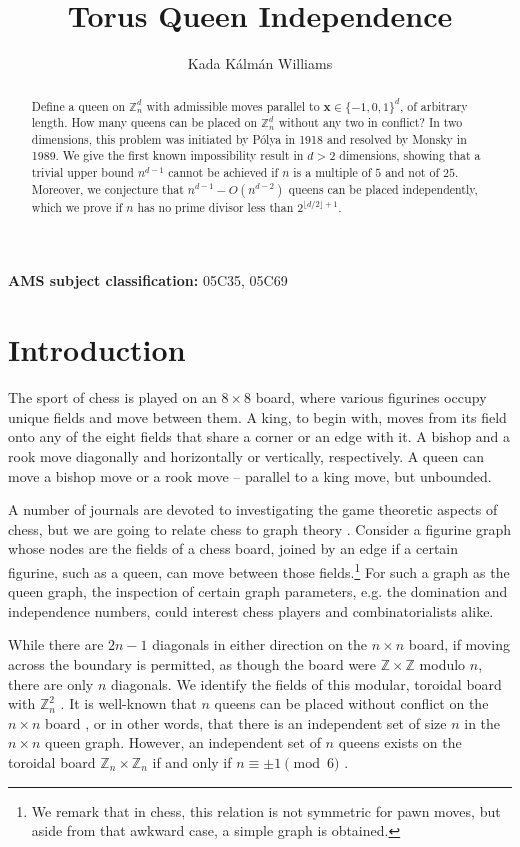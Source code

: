\documentclass[11pt]{article}
\title{Torus Queen Independence}
\author{Kada Kálmán Williams}
\begin{document}
\maketitle

\begin{abstract}
    Define a queen on $\mathbb{Z}_n^d$ with admissible moves parallel to $\mathbf{x}\in\{-1,0,1\}^d$, of arbitrary length. How many queens can be placed on $\mathbb{Z}_n^d$ without any two in conflict? In two dimensions, this problem was initiated by Pólya in 1918 and resolved by Monsky in 1989. We give the first known impossibility result in $d>2$ dimensions, showing that a trivial upper bound $n^{d-1}$ cannot be achieved if $n$ is a multiple of $5$ and not of $25$. Moreover, we conjecture that $n^{d-1}-O(n^{d-2})$ queens can be placed independently, which we prove if $n$ has no prime divisor less than $2^{\lfloor d/2\rfloor +1}$.
\end{abstract}

\textbf{AMS subject classification:} 05C35, 05C69

\section{Introduction}

The sport of chess is played on an $8\times 8$ board, where various figurines occupy unique fields and move between them. A king, to begin with, moves from its field onto any of the eight fields that share a corner or an edge with it. A bishop and a rook move diagonally and horizontally or vertically, respectively. A queen can move a bishop move or a rook move -- parallel to a king move, but unbounded.

A number of journals are devoted to investigating the game theoretic aspects of chess, but we are going to relate chess to graph theory \cite{HeH}. Consider a figurine graph whose nodes are the fields of a chess board, joined by an edge if a certain figurine, such as a queen, can move between those fields.\footnote{We remark that in chess, this relation is not symmetric for pawn moves, but aside from that awkward case, a simple graph is obtained.} For such a graph as the queen graph, the inspection of certain graph parameters, e.g. the domination and independence numbers, could interest chess players and combinatorialists alike.

While there are $2n-1$ diagonals in either direction on the $n\times n$ board, if moving across the boundary is permitted, as though the board were $\mathbb{Z}\times \mathbb{Z}$ modulo $n$, there are only $n$ diagonals. We identify the fields of this modular, toroidal board with $\mathbb{Z}_n^2$ \cite{BeS}. It is well-known that $n$ queens can be placed without conflict on the $n\times n$ board \cite{Pau}, or in other words, that there is an independent set of size $n$ in the $n\times n$ queen graph. However, an independent set of $n$ queens exists on the toroidal board $\mathbb{Z}_n\times \mathbb{Z}_n$ if and only if $n\equiv \pm 1\pmod 6$ \cite{Pol}.
\end{document}
